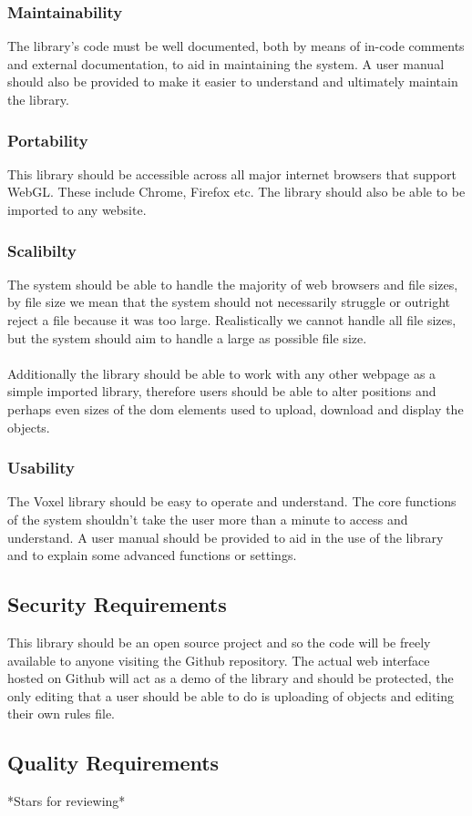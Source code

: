 \documentclass[english]{article}
\begin{document}
		\subsubsection{Maintainability}
		The library's code must be well documented, both by means of in-code comments and external documentation, to aid in 
		maintaining the system. A user manual should also be provided to make it easier to understand and ultimately maintain the library.
		
		\subsubsection{Portability}
		This library should be accessible across all major internet browsers that support WebGL. These include Chrome, Firefox etc.
		The library should also be able to be imported to any website.
		
		\subsubsection{Scalibilty}
		The system should be able to handle the majority of web browsers and file sizes, by file size we mean that the system should not necessarily struggle or outright reject a file because it was too large. Realistically we cannot handle all file sizes, but the system should aim to handle a large as possible file size. 
		\\\\
		Additionally the library should be able to work with any other webpage as a simple imported library, therefore users should be able to alter positions and perhaps even sizes of the dom elements used to upload, download and display the objects.
		
		\subsubsection{Usability}
		The Voxel library should be easy to operate and understand. The core functions of the system shouldn't take the user more 
		than a minute to access and understand. A user manual should be provided to aid in the use of the library and to explain some advanced functions or settings.
		
		\subsection{Security Requirements}
		This library should be an open source project and so the code will be freely available to anyone visiting the Github repository. The actual web interface hosted on Github will act as a demo of the library and should be protected, the only editing that a user should be able to do is uploading of objects and editing their own rules file.
		
		\subsection{Quality Requirements}
		*Stars for reviewing*
		
	\pagebreak
	
\end{document}
